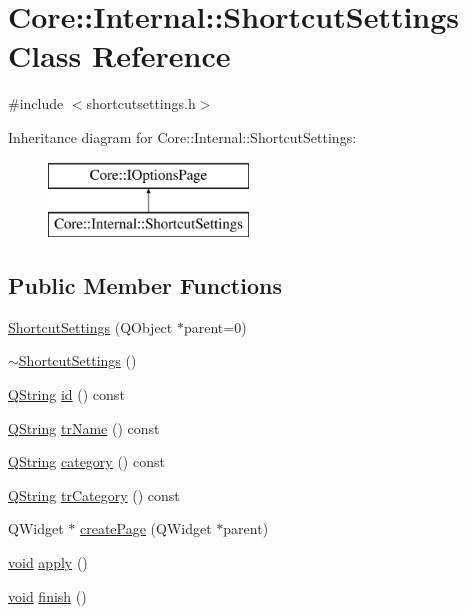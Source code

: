 \hypertarget{class_core_1_1_internal_1_1_shortcut_settings}{\section{\-Core\-:\-:\-Internal\-:\-:\-Shortcut\-Settings \-Class \-Reference}
\label{class_core_1_1_internal_1_1_shortcut_settings}
}


{\ttfamily \#include $<$shortcutsettings.\-h$>$}

\-Inheritance diagram for \-Core\-:\-:\-Internal\-:\-:\-Shortcut\-Settings\-:\begin{figure}[H]
\begin{center}
\leavevmode
\includegraphics[height=2.000000cm]{class_core_1_1_internal_1_1_shortcut_settings}
\end{center}
\end{figure}
\subsection*{\-Public \-Member \-Functions}
\begin{DoxyCompactItemize}
\item 
\hyperlink{group___core_plugin_gaf70df8ce0b86b325f7a03c1cc0dac919}{\-Shortcut\-Settings} (\-Q\-Object $\ast$parent=0)
\item 
\hyperlink{group___core_plugin_gabeeacedad8a9934f806dee1c668772f8}{$\sim$\-Shortcut\-Settings} ()
\item 
\hyperlink{group___u_a_v_objects_plugin_gab9d252f49c333c94a72f97ce3105a32d}{\-Q\-String} \hyperlink{group___core_plugin_ga6bf5939a71d98d6730b4be6a6dd44683}{id} () const 
\item 
\hyperlink{group___u_a_v_objects_plugin_gab9d252f49c333c94a72f97ce3105a32d}{\-Q\-String} \hyperlink{group___core_plugin_gac66e4afb26039d1962aafba03483d8f9}{tr\-Name} () const 
\item 
\hyperlink{group___u_a_v_objects_plugin_gab9d252f49c333c94a72f97ce3105a32d}{\-Q\-String} \hyperlink{group___core_plugin_gae3538343d97ec3f12f40c6850e470e69}{category} () const 
\item 
\hyperlink{group___u_a_v_objects_plugin_gab9d252f49c333c94a72f97ce3105a32d}{\-Q\-String} \hyperlink{group___core_plugin_ga5a6e59bc0d5312685098a6fca0ba25a1}{tr\-Category} () const 
\item 
\-Q\-Widget $\ast$ \hyperlink{group___core_plugin_gaf7e9d074d68e776d7620245d618d53fb}{create\-Page} (\-Q\-Widget $\ast$parent)
\item 
\hyperlink{group___u_a_v_objects_plugin_ga444cf2ff3f0ecbe028adce838d373f5c}{void} \hyperlink{group___core_plugin_ga9687a6a6adca6b21a1a107bb21f2413a}{apply} ()
\item 
\hyperlink{group___u_a_v_objects_plugin_ga444cf2ff3f0ecbe028adce838d373f5c}{void} \hyperlink{group___core_plugin_gaaa8b1fcc735f8ee889144706989f37b7}{finish} ()
\end{DoxyCompactItemize}
